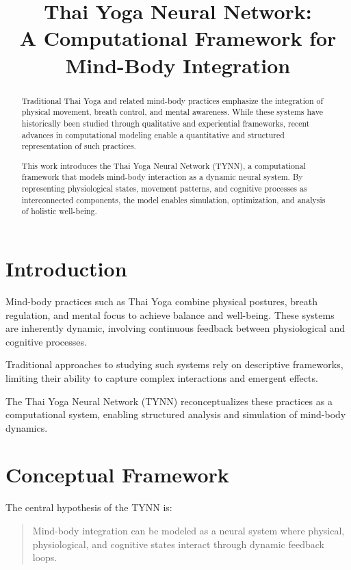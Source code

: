 \documentclass[12pt]{article}
\title{\textbf{Thai Yoga Neural Network: \\ A Computational Framework for Mind-Body Integration}}
\author{}
\date{}
\begin{document}
\maketitle

\begin{abstract}
Traditional Thai Yoga and related mind-body practices emphasize the integration of physical movement, breath control, and mental awareness. While these systems have historically been studied through qualitative and experiential frameworks, recent advances in computational modeling enable a quantitative and structured representation of such practices.

This work introduces the Thai Yoga Neural Network (TYNN), a computational framework that models mind-body interaction as a dynamic neural system. By representing physiological states, movement patterns, and cognitive processes as interconnected components, the model enables simulation, optimization, and analysis of holistic well-being.
\end{abstract}

\section{Introduction}

Mind-body practices such as Thai Yoga combine physical postures, breath regulation, and mental focus to achieve balance and well-being. These systems are inherently dynamic, involving continuous feedback between physiological and cognitive processes.

Traditional approaches to studying such systems rely on descriptive frameworks, limiting their ability to capture complex interactions and emergent effects.

The Thai Yoga Neural Network (TYNN) reconceptualizes these practices as a computational system, enabling structured analysis and simulation of mind-body dynamics.

\section{Conceptual Framework}

The central hypothesis of the TYNN is:

\begin{quote}
Mind-body integration can be modeled as a neural system where physical, physiological, and cognitive states interact through dynamic feedback loops.
\end{quote}
\end{document}
